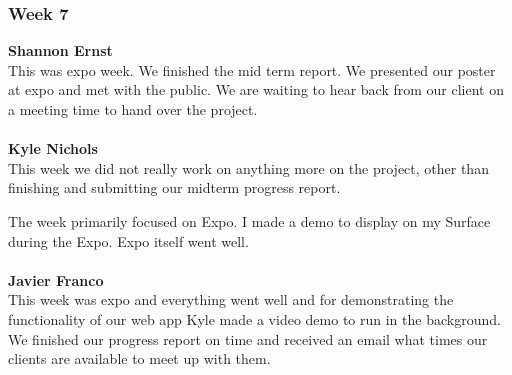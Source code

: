 \documentclass[../final.tex]{subfiles}
\begin{document}
\subsubsection{Week 7}
\textbf{Shannon Ernst}\\
This was expo week. We finished the mid term report. We presented our poster at expo and met with the public. We are waiting to hear back from our client on a meeting time to hand over the project. \\ \\
\textbf{Kyle Nichols}\\
This week we did not really work on anything more on the project, other than finishing and submitting our midterm progress report.

The week primarily focused on Expo. I made a demo to display on my Surface during the Expo. Expo itself went well. \\ \\
\textbf{Javier Franco}\\
This week was expo and everything went well and for demonstrating the functionality of our web app Kyle made a video demo to run in the background. We finished our progress report on time and received an email what times our clients are available to meet up with them. \\
\end{document}
